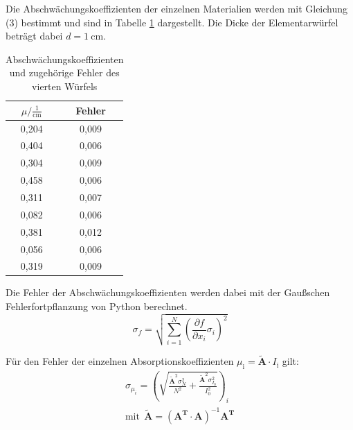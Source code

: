 Die Abschwächungskoeffizienten der einzelnen Materialien werden mit Gleichung (3) bestimmt und sind in Tabelle \ref{tab:blob} dargestellt.
Die Dicke der Elementarwürfel beträgt dabei $d=\SI{1}{\centi\meter}$.
\begin{table}[H]
  \centering
  \caption{Abschwächungskoeffizienten und zugehörige Fehler des vierten Würfels}
  \label{tab:blob}
  \begin{tabular}{c c}
    \toprule
    $\mu/ \mathrm{\frac{1}{cm}}$ & Fehler   \\
    \midrule
    0,204      &  0,009 \\
    0,404      &  0,006 \\
    0,304      &  0,009 \\
    0,458      &  0,006 \\
    0,311      &  0,007 \\
    0,082      &  0,006 \\
    0,381      &  0,012 \\
    0,056      &  0,006 \\
    0,319      &  0,009 \\
    \bottomrule
  \end{tabular}
\end{table}


Die Fehler der Abschwächungskoeffizienten werden dabei mit der Gaußschen Fehlerfortpflanzung von Python berechnet.
\begin{equation}
  \sigma_f = \sqrt{
      \sum\limits_{i = 1}^N
       \left( \frac{\partial f}{\partial x_i} \sigma_i \right)^{\!\! 2}
     }
\end{equation}

Für den Fehler der einzelnen Absorptionskoeffizienten $\mu_{\mathrm{i}}= \symbf{\tilde{A}} \cdot I_{\mathrm{i}}$ gilt:
\begin{align*}
  \sigma_{\mu_i} = \left(\sqrt{\frac{\symbf{\tilde{A}}^2 \sigma_{N}^2}{N^2} + \frac{\symbf{\tilde{A}}^{2} \sigma_{I_{0}}^2}{I_{0}^2}}\right)_i \\
  \text{mit}\:\: \symbf{\tilde{A}} = \left(\symbf{A^T} \cdot \symbf{A}\right)^{-1} \symbf{A^T}
\end{align*}
